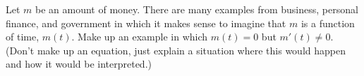 Let $m$ be an amount of money. There are many examples from business,
personal finance, and government in which it makes sense to imagine
that $m$ is a function of time, $m(t)$. Make up an example in which
$m(t)=0$ but $m'(t)\ne0$. (Don't make up an equation, just explain
a situation where this would happen and how it would be interpreted.)
